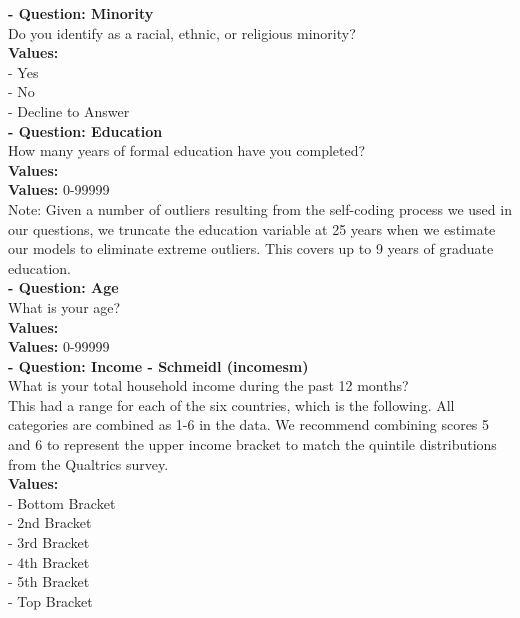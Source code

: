 \documentclass[12pt]{article}
\begin{document}
\noindent\textbf{  - Question: Minority} \\
Do you identify as a racial, ethnic, or religious minority?\\
\textbf{Values:}\\
 - Yes\\
 - No\\
 - Decline to Answer\\

\noindent\textbf{  - Question: Education} \\
How many years of formal education have you completed?\\
\textbf{Values:}\\
\textbf{Values:} 0-99999\\

\noindent Note: Given a number of outliers resulting from the self-coding process we used in our questions, we truncate the education variable at 25 years when we estimate our models to eliminate extreme outliers. This covers up to 9 years of graduate education. \\


\noindent\textbf{  - Question: Age} \\
What is your age?\\
\textbf{Values:}\\
\textbf{Values:} 0-99999\\


\noindent\textbf{  - Question: Income - Schmeidl (incomesm)} \\
What is your total household income during the past 12 months? \\
This had a range for each of the six countries, which is the following. All categories are combined as 1-6 in the data. We recommend combining scores 5 and 6 to represent the upper income bracket to match the quintile distributions from the Qualtrics survey.\\
\textbf{Values:}\\
 - Bottom Bracket\\
 - 2nd Bracket\\
 - 3rd Bracket\\
 - 4th Bracket\\
 - 5th Bracket\\
 - Top Bracket\\
\end{document}
